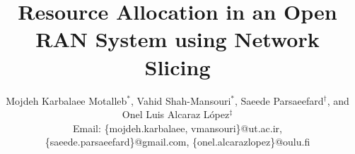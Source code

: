 \documentclass[lettersize,journal]{IEEEtran}
\begin{document}
\title{Resource Allocation in an Open RAN System using Network Slicing\vspace{-.1cm}
}
\author{\small Mojdeh Karbalaee Motalleb$^*$, Vahid Shah-Mansouri$^*$, Saeede Parsaeefard$^\dagger$, and Onel Luis Alcaraz López$^\ddagger$ \\ Email: \{mojdeh.karbalaee, vmansouri\}@ut.ac.ir, \{saeede.parsaeefard\}@gmail.com, \{onel.alcarazlopez\}@oulu.fi\\
 }
\maketitle
{}
\end{document}
